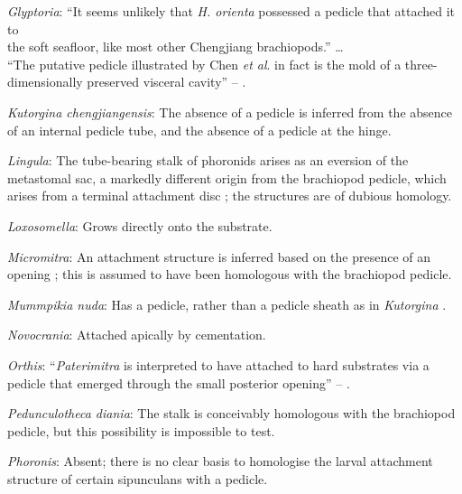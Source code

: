 \documentclass[openany]{book}
\theoremstyle{definition}
\theoremstyle{definition}
\theoremstyle{definition}
\theoremstyle{remark}
\begin{document}
\hypertarget{Glyptoria-coding-21}{}
\emph{Glyptoria}: ``It seems unlikely that \emph{H. orienta} possessed a
pedicle that attached it to\\
the soft seafloor, like most other Chengjiang brachiopods.'' \ldots{}\\
``The putative pedicle illustrated by Chen \emph{et al}.
\citeyearpar[Figs 4, 6, 7]{Chen2007Reinterpretationof} in fact is the
mold of a three-dimensionally preserved visceral cavity'' --
\citet{Zhang2009Architectureand}.

\hypertarget{Kutorgina_chengjiangensis-coding-21}{}
\emph{Kutorgina chengjiangensis}: The absence of a pedicle is inferred
from the absence of an internal pedicle tube, and the absence of a
pedicle at the hinge.

\hypertarget{Lingula-coding-21}{}
\emph{Lingula}: The tube-bearing stalk of phoronids arises as an
eversion of the metastomal sac, a markedly different origin from the
brachiopod pedicle, which arises from a terminal attachment disc
\citep{Young2002}; the structures are of dubious homology.

\hypertarget{Loxosomella-coding-21}{}
\emph{Loxosomella}: Grows directly onto the substrate.

\hypertarget{Micromitra-coding-21}{}
\emph{Micromitra}: An attachment structure is inferred based on the
presence of an opening \citep{Balthasar2004Shellstructure}; this is
assumed to have been homologous with the brachiopod pedicle.

\hypertarget{Mummpikia_nuda-coding-21}{}
\emph{Mummpikia nuda}: Has a pedicle, rather than a pedicle sheath as in
\emph{Kutorgina}
\citep{Holmer2018Evolutionarysignificance, Holmer2018Theattachment}.

\hypertarget{Novocrania-coding-21}{}
\emph{Novocrania}: Attached apically by cementation.

\hypertarget{Orthis-coding-21}{}
\emph{Orthis}: ``\emph{Paterimitra} is interpreted to have attached to
hard substrates via a pedicle that emerged through the small posterior
opening'' -- \citet{Skovsted2009Thescleritome}.

\hypertarget{Pedunculotheca_diania-coding-21}{}
\emph{Pedunculotheca diania}: The stalk is conceivably homologous with
the brachiopod pedicle, but this possibility is impossible to test.

\hypertarget{Phoronis-coding-21}{}
\emph{Phoronis}: Absent; there is no clear basis to homologise the
larval attachment structure of certain sipunculans with a pedicle.
\end{document}
